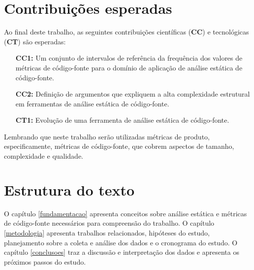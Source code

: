 \section{Contribuições esperadas}

Ao final deste trabalho, as seguintes contribuições científicas ({\bf CC}) e
tecnológicas ({\bf CT}) são esperadas:

\begin{enumerate}
  \item [{\bf CC1:}] Um conjunto de intervalos de referência da frequência dos
    valores de métricas de código-fonte para o domínio de aplicação de
    análise estática de código-fonte.
  \item [{\bf CC2:}] Definição de argumentos que expliquem a alta complexidade
    estrutural em ferramentas de análise estática de código-fonte.
  \item [{\bf CT1:}] Evolução de uma ferramenta de análise estática de
    código-fonte.
\end{enumerate}

Lembrando que neste trabalho serão utilizadas métricas de produto,
especificamente, métricas de código-fonte, que cobrem aspectos de tamanho,
complexidade e qualidade.

\section{Estrutura do texto} 

O capítulo \ref{fundamentacao} apresenta conceitos sobre análise estática e
métricas de código-fonte necessários para compreensão do trabalho. O capítulo
\ref{metodologia} apresenta trabalhos relacionados, hipóteses do estudo,
planejamento sobre a coleta e análise dos dados
e o cronograma do estudo. O capítulo \ref{conclusoes} traz a
discussão e interpretação dos dados e apresenta os próximos passos do estudo.
